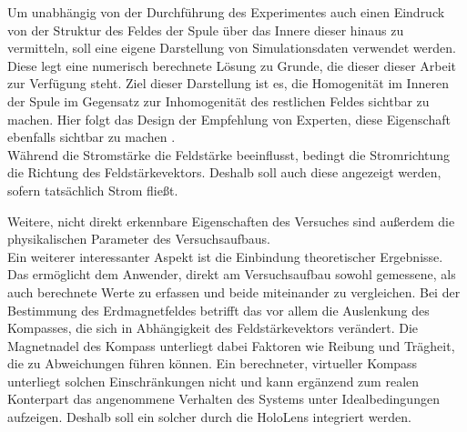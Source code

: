 Um unabhängig von der Durchführung des Experimentes auch einen Eindruck von der Struktur des Feldes der Spule über das Innere dieser hinaus zu vermitteln, soll eine eigene Darstellung von Simulationsdaten verwendet werden. Diese legt eine numerisch berechnete Lösung zu Grunde, die dieser dieser Arbeit zur Verfügung steht. Ziel dieser Darstellung ist es, die Homogenität im Inneren der Spule im Gegensatz zur Inhomogenität des restlichen Feldes sichtbar zu machen. Hier folgt das Design der Empfehlung von Experten, diese Eigenschaft ebenfalls sichtbar zu machen \autocite{Reinholz18}.\\

Während die Stromstärke die Feldstärke beeinflusst, bedingt die Stromrichtung die Richtung des Feldstärkevektors. Deshalb soll auch diese angezeigt werden, sofern tatsächlich Strom fließt.

 Weitere, nicht direkt erkennbare Eigenschaften des Versuches sind außerdem die physikalischen Parameter des Versuchsaufbaus.\\

Ein weiterer interessanter Aspekt ist die Einbindung theoretischer Ergebnisse. Das ermöglicht dem Anwender, direkt am Versuchsaufbau sowohl gemessene, als auch berechnete Werte zu erfassen und beide miteinander zu vergleichen. Bei der Bestimmung des Erdmagnetfeldes betrifft das vor allem die Auslenkung des Kompasses, die sich in Abhängigkeit des Feldstärkevektors verändert. Die Magnetnadel des Kompass unterliegt dabei Faktoren wie Reibung und Trägheit, die zu Abweichungen führen können. Ein berechneter, virtueller Kompass unterliegt solchen Einschränkungen nicht und kann ergänzend zum realen Konterpart das angenommene Verhalten des Systems unter Idealbedingungen aufzeigen. Deshalb soll ein solcher durch die HoloLens integriert werden.\\

